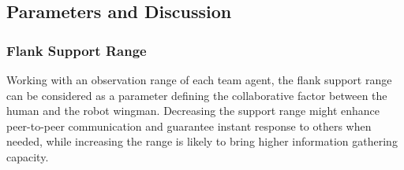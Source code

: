 \documentclass[12pt]{article}
\begin{document}
\subsection{Parameters and Discussion}

\subsubsection{Flank Support Range}

Working with an observation range of each team agent, the flank support range can be considered as a parameter defining the collaborative factor between the human and the robot wingman. Decreasing the support range might enhance peer-to-peer communication and guarantee instant response to others when needed, while increasing the range is likely to bring higher information gathering capacity.
\end{document}
